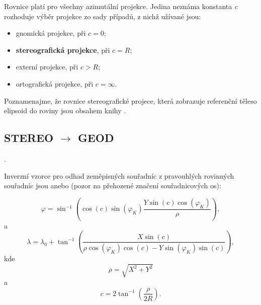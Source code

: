 Rovnice platí pro všechny azimutální projekce. Jedina neznáma konstanta \textit{c} rozhoduje výběr projekce zo sady případů, z nichž užívané jsou:
\begin{itemize}
\item gnomická projekce, při $c = 0$;
\item {\textbf{stereografická projekce}}, při $c = R$;
\item externí projekce, při $c > R$;
\item ortografická projekce, při $c = \infty$.
\end{itemize} 

Poznamenajme, že rovnice stereografické projece, která zobrazuje referenční těleso elipsoid do roviny jsou obsahem knihy \cite{Snyder1987}.

\subsection{STEREO $\rightarrow$ GEOD}.

Inverzní vzorce pro odhad zeměpisných souřadníc z pravouhlých rovinných souřadníc jsou \cite{Thomas1977} anebo \cite{stereoWolf} (pozor na přehozené značení souřadnicových os):

\begin{equation}
\varphi = \sin^{-1}{\left(\cos{\left(c\right)}\sin{\left(\varphi_{K}\right)}\dfrac{Y\sin{\left(c\right)}\cos{\left(\varphi_{K}\right)}}{\rho}\right)},
\end{equation}
a
\begin{equation}
\lambda = \lambda_{0} +  \tan^{-1}{\left(\dfrac{X\sin{\left(c\right)}}{\rho\cos{\left(\varphi_{K}\right)}\cos{\left(c\right)}-Y\sin{\left(\varphi_{K}\right)}\sin{\left(c\right)}}\right)},
\end{equation}
kde
\begin{equation}
\rho = \sqrt{X^{2} + Y^{2}}
\end{equation}
a
\begin{equation}
c = 2\tan^{-1}{\left(\dfrac{\rho}{2R}\right)}.
\end{equation}

